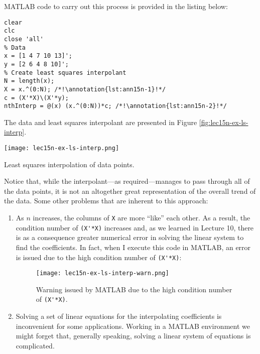 \noindent MATLAB code to carry out this process is provided in the listing below:
\begin{lstlisting}[style=myMatlab]
clear
clc
close 'all'
% Data
x = [1 4 7 10 13]';
y = [2 6 4 8 10]';
% Create least squares interpolant
N = length(x);
X = x.^(0:N); /*!\annotation{lst:ann15n-1}!*/
c = (X'*X)\(X'*y);
nthInterp = @(x) (x.^(0:N))*c; /*!\annotation{lst:ann15n-2}!*/
\end{lstlisting}

\noindent The data and least squares interpolant are presented in Figure \ref{fig:lec15n-ex-ls-interp}.  
\begin{marginfigure}
\texttt{[image: lec15n-ex-ls-interp.png]}
\caption{Least squares interpolation of data points.}
\label{fig:lec15n-ex-ls-interp}
\end{marginfigure}
Notice that, while the interpolant---as required---manages to pass through all of the data points, it is not an altogether great representation of the overall trend of the data. Some other problems that are inherent to this approach:
\begin{enumerate}
\item As $n$ increases, the columns of \lstinline[style=myMatlab]{X} are more ``like'' each other.  As a result, the condition number of \lstinline[style=myMatlab]{(X'*X)} increases and, as we learned in Lecture 10, there is as a consequence greater numerical error in solving the linear system to find the coefficients.  In fact, when I execute this code in MATLAB, an error is issued due to the high condition number of \lstinline[style=myMatlab]{(X'*X)}:

\begin{figure}
\texttt{[image: lec15n-ex-ls-interp-warn.png]}
\caption{Warning issued by MATLAB due to the high condition number of \lstinline[style=myMatlab]{(X'*X)}.}
\label{fig:lec15n-ex-ls-interp-warn}
\end{figure}

\item Solving a set of linear equations for the interpolating coefficients is inconvenient for some applications.  Working in a MATLAB environment we might forget that, generally speaking, solving a linear system of equations is complicated. 
\end{enumerate}


